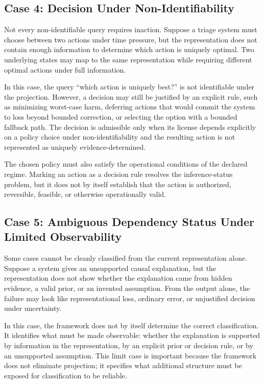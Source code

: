 \documentclass[11pt]{article}
\theoremstyle{definition}
\theoremstyle{remark}
\begin{document}
\subsection{Case 4: Decision Under Non-Identifiability}

Not every non-identifiable query requires inaction. Suppose a triage system must choose between two actions under time pressure, but the representation does not contain enough information to determine which action is uniquely optimal. Two underlying states may map to the same representation while requiring different optimal actions under full information.

In this case, the query ``which action is uniquely best?'' is not identifiable under the projection. However, a decision may still be justified by an explicit rule, such as minimizing worst-case harm, deferring actions that would commit the system to loss beyond bounded correction, or selecting the option with a bounded fallback path. The decision is admissible only when its license depends explicitly on a policy choice under non-identifiability and the resulting action is not represented as uniquely evidence-determined.

The chosen policy must also satisfy the operational conditions of the declared regime. Marking an action as a decision rule resolves the inference-status problem, but it does not by itself establish that the action is authorized, reversible, feasible, or otherwise operationally valid.

\subsection{Case 5: Ambiguous Dependency Status Under Limited Observability}

Some cases cannot be cleanly classified from the current representation alone. Suppose a system gives an unsupported causal explanation, but the representation does not show whether the explanation came from hidden evidence, a valid prior, or an invented assumption. From the output alone, the failure may look like representational loss, ordinary error, or unjustified decision under uncertainty.

In this case, the framework does not by itself determine the correct classification. It identifies what must be made observable: whether the explanation is supported by information in the representation, by an explicit prior or decision rule, or by an unsupported assumption. This limit case is important because the framework does not eliminate projection; it specifies what additional structure must be exposed for classification to be reliable.
\end{document}
